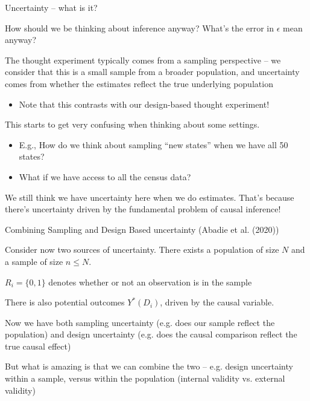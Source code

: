 \documentclass[notes,11pt, aspectratio=169]{beamer}
\newenvironment{wideitemize}{\itemize\addtolength{\itemsep}{10pt}}{\enditemize}
\begin{document}
\begin{frame}{Uncertainty -- what is it?}
  \begin{wideitemize}
  \item How should we be thinking about inference anyway? What's the error in $\epsilon$ mean anyway?
  \item The thought experiment typically comes from a sampling
    perspective -- we consider that this is a small sample from a
    broader population, and uncertainty comes from whether the estimates reflect the true underlying population
    \begin{itemize}
    \item Note that this contrasts with our design-based thought experiment!
    \end{itemize}
  \item This starts to get very confusing when thinking about some settings.
    \begin{itemize}
    \item E.g., How do we think about sampling ``new states'' when we have all 50 states?
    \item What if we have access to all the census data?
    \end{itemize}
  \item We still think we have uncertainty here when we do
    estimates. That's because there's uncertainty driven by the
    fundamental problem of causal inference!
  \end{wideitemize}
\end{frame}


\begin{frame}{Combining Sampling and Design Based uncertainty (Abadie et al. (2020))}
  \begin{wideitemize}
  \item Consider now two sources of uncertainty. There exists a population of size $N$ and a sample of size $n \leq N$.
  \item $R_{i} = \{0,1\}$ denotes whether or not an observation is in the sample
  \item There is also potential outcomes $Y^{*}(D_{i})$, driven by the
    causal variable.
  \item Now we have both sampling uncertainty (e.g. does our sample
    reflect the population) and design uncertainty (e.g. does the
    causal comparison reflect the true causal effect)
  \item But what is amazing is that we can combine the two --
    e.g. design uncertainty within a sample, versus within the
    population (internal validity vs. external validity)
  \end{wideitemize}
\end{frame}
\end{document}
